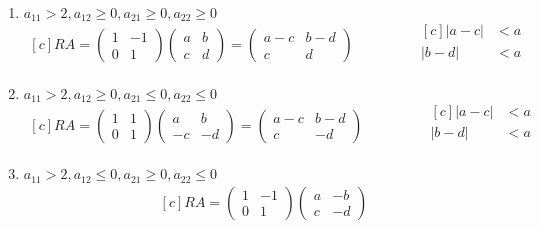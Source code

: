 \documentclass{article}
\newcommand\tab[1][0.6cm]{\hspace*{#1}}
\newcommand\nl{\newline\tab}
\begin{document}
\begin{enumerate}
\begin{enumerate}
			\item $a_{11} > 2, a_{12} \geq 0, a_{21} \geq 0, a_{22} \geq 0$ \nl
			$$
			\begin{aligned}[c]
			RA = 
			\begin{pmatrix}
			1 & -1 \\
			0 & 1 
			\end{pmatrix} 
			\begin{pmatrix}
			a & b \\
			c & d 
			\end{pmatrix} 
			= 
			\begin{pmatrix}
			a-c & b-d \\
			c & d 
			\end{pmatrix}
			\end{aligned}
			\qquad\qquad
			\begin{aligned}[c]
			|a - c| &< a\\
			|b - d| &< a\\
			\end{aligned}
			$$
			\item $a_{11} > 2, a_{12} \geq 0, a_{21} \leq 0, a_{22} \leq 0$ \nl
			$$
			\begin{aligned}[c]
			RA = 
			\begin{pmatrix}
			1 & 1 \\
			0 & 1 
			\end{pmatrix} 
			\begin{pmatrix}
			a & b \\
			-c & -d 
			\end{pmatrix} 
			= 
			\begin{pmatrix}
			a-c & b-d \\
			c & -d 
			\end{pmatrix}
			\end{aligned}
			\qquad\qquad
			\begin{aligned}[c]
			|a - c| &< a\\
			|b - d| &< a\\
			\end{aligned}
			$$
			\item $a_{11} > 2, a_{12} \leq 0, a_{21} \geq 0, a_{22} \leq 0$ \nl
			$$
			\begin{aligned}[c]
			RA = 
			\begin{pmatrix}
			1 & -1 \\
			0 & 1 
			\end{pmatrix} 
			\begin{pmatrix}
			a & -b \\
			c & -d 
			\end{pmatrix} 

\end{aligned}$$
\end{enumerate}
\end{enumerate}
\end{document}
